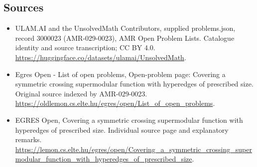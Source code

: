 \documentclass[11pt,a4paper]{article}
\begin{document}
\subsection{Sources}
\begin{itemize}
\item[S1] ULAM.AI and the UnsolvedMath Contributors, supplied problems.json, record 3000023 (AMR-029-0023), AMR Open Problem Lists. Catalogue identity and source transcription; CC BY 4.0.
\url{https://huggingface.co/datasets/ulamai/UnsolvedMath}.
\item[S2] Egres Open - List of open problems, Open-problem page: Covering a symmetric crossing supermodular function with hyperedges of prescribed size. Original source indexed by AMR-029-0023.
\url{https://oldlemon.cs.elte.hu/egres/open/List_of_open_problems}.
\item[S3] EGRES Open, Covering a symmetric crossing supermodular function with hyperedges of prescribed size. Individual source page and explanatory remarks.
\url{https://lemon.cs.elte.hu/egres/open/Covering_a_symmetric_crossing_supermodular_function_with_hyperedges_of_prescribed_size}.
\end{itemize}
\end{document}
